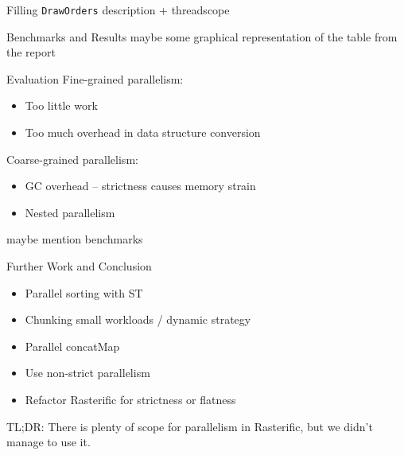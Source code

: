 \documentclass[slidestop,compress,mathserif, xcolor=table]{beamer}
\begin{document}
\begin{frame}[c]{Filling \texttt{DrawOrders}}
description + threadscope
\end{frame}

\begin{frame}[c]{Benchmarks and Results}
maybe some graphical representation of the table from the report
\end{frame}

\begin{frame}[c]{Evaluation}
Fine-grained parallelism:
\begin{itemize}
\item Too little work
\item Too much overhead in data structure conversion
\end{itemize}
\bigskip

Coarse-grained parallelism:
\begin{itemize}
\item GC overhead -- strictness causes memory strain
\item Nested parallelism
\end{itemize}

maybe mention benchmarks
\end{frame}

\begin{frame}[c]{Further Work and Conclusion}

\begin{itemize}
\item Parallel sorting with ST
\item Chunking small workloads / dynamic strategy
\item Parallel concatMap
\item Use non-strict parallelism
\item Refactor Rasterific for strictness or flatness
\end{itemize}

\bigskip

TL;DR: There is plenty of scope for parallelism in Rasterific, but we didn't manage to use it.

\end{frame}
\end{document}
